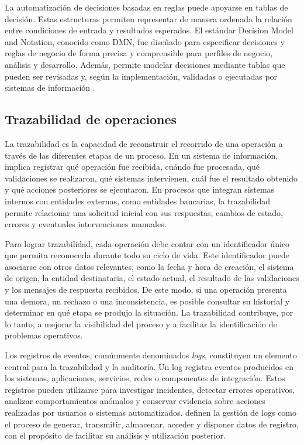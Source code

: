 La automatización de decisiones basadas en reglas puede apoyarse en tablas de decisión. Estas estructuras permiten representar de manera ordenada la relación entre condiciones de entrada y resultados esperados. El estándar Decision Model and Notation, conocido como DMN, fue diseñado para especificar decisiones y reglas de negocio de forma precisa y comprensible para perfiles de negocio, análisis y desarrollo. Además, permite modelar decisiones mediante tablas que pueden ser revisadas y, según la implementación, validadas o ejecutadas por sistemas de información \citep{omg_dmn}.

\subsection{Trazabilidad de operaciones}

La trazabilidad es la capacidad de reconstruir el recorrido de una operación a través de las diferentes etapas de un proceso. En un sistema de información, implica registrar qué operación fue recibida, cuándo fue procesada, qué validaciones se realizaron, qué sistemas intervienen, cuál fue el resultado obtenido y qué acciones posteriores se ejecutaron. En procesos que integran sistemas internos con entidades externas, como entidades bancarias, la trazabilidad permite relacionar una solicitud inicial con sus respuestas, cambios de estado, errores y eventuales intervenciones manuales.

Para lograr trazabilidad, cada operación debe contar con un identificador único que permita reconocerla durante todo su ciclo de vida. Este identificador puede asociarse con otros datos relevantes, como la fecha y hora de creación, el sistema de origen, la entidad destinataria, el estado actual, el resultado de las validaciones y los mensajes de respuesta recibidos. De este modo, si una operación presenta una demora, un rechazo o una inconsistencia, es posible consultar su historial y determinar en qué etapa se produjo la situación. La trazabilidad contribuye, por lo tanto, a mejorar la visibilidad del proceso y a facilitar la identificación de problemas operativos.

Los registros de eventos, comúnmente denominados \emph{logs}, constituyen un elemento central para la trazabilidad y la auditoría. Un log registra eventos producidos en los sistemas, aplicaciones, servicios, redes o componentes de integración. Estos registros pueden utilizarse para investigar incidentes, detectar errores operativos, analizar comportamientos anómalos y conservar evidencia sobre acciones realizadas por usuarios o sistemas automatizados. \citet{kent2006} definen la gestión de logs como el proceso de generar, transmitir, almacenar, acceder y disponer datos de registro, con el propósito de facilitar su análisis y utilización posterior.

